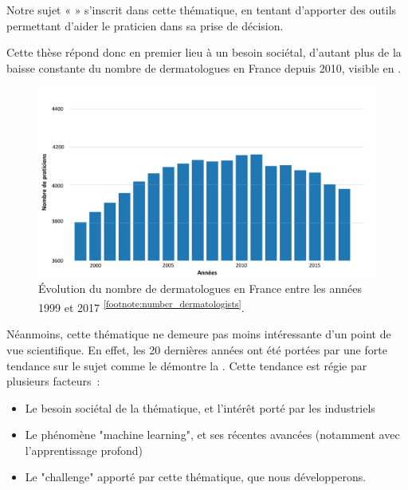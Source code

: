 Notre sujet « \titleref » s’inscrit dans cette thématique, en tentant d’apporter des outils permettant d’aider le praticien dans sa prise de décision.\par

Cette thèse répond donc en premier lieu à un besoin sociétal, d'autant plus de la baisse constante du nombre de dermatologues en France depuis 2010, visible en .
\begin{figure}[H]
    \centering
    \includegraphics[width=\linewidth]{contents/i_introduction/resources/evolution_dermatologists.pdf}
    \caption{Évolution du nombre de dermatologues en France entre les années 1999 et 2017 \textsuperscript{\ref{footnote:number_dermatologists}}.}
    \label{fig:number_dermatologists}
\end{figure}\par
\addtocounter{footnote}{1}

Néanmoins, cette thématique ne demeure pas moins intéressante d’un point de vue scientifique. En effet, les 20 dernières années ont été portées par une forte tendance sur le sujet comme le démontre la . Cette tendance est régie par plusieurs facteurs~:
\begin{itemize}
    \item Le besoin sociétal de la thématique, et l'intérêt porté par les industriels
    \item Le phénomène "machine learning", et ses récentes avancées (notamment avec l'apprentissage profond)
    \item Le "challenge" apporté par cette thématique, que nous développerons.
\end{itemize}\par

